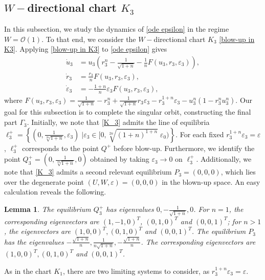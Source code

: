\documentclass[10pt,a4paper]{amsart}
\newtheorem{lem}{Lemma}
\begin{document}
\subsection{$W-$directional chart $K_3$}
In this subsection, we study the dynamics of \eqref{ode epsilon} in the regime $W=\mathcal{O}(1)$. To that end, we consider the $W-$directional chart $K_3$ \eqref{blow-up in K3}.
Applying \eqref{blow-up in K3} to \eqref{ode epsilon} gives 
\begin{equation}
    \begin{aligned}
        \dot{u}_3&=u_3\left(r_3^n-\tfrac{1}{\sqrt{1+n}}-\tfrac{1}{n}F(u_3, r_3, \varepsilon_3)\right),\\
        \dot{r}_3&=\tfrac{r_3}{n} F(u_3, r_3, \varepsilon_3),\\
        \dot{\varepsilon}_3&=-\tfrac{1+n}{n}\varepsilon_3 F(u_3, r_3, \varepsilon_3),
        \label{K_3}
    \end{aligned}
\end{equation}
where $F(u_3, r_3, \varepsilon_3)=\tfrac{1}{\sqrt{1+n}}-r_3^n+\tfrac{1}{\sqrt{1+n}}r_3\varepsilon_3-r_3^{1+n}\varepsilon_3-u_3^n(1-r_3^nu_3^n)$.
Our goal for this subsection is to complete the singular orbit, constructing the final part $\Gamma_3$.
Initially, we note that \eqref{K_3} admits the line of equilibria $\ell_3^+=\left\{\left(0, \tfrac{1}{\sqrt[2n]{1+n}}, \varepsilon_3\right)\;\big|\varepsilon_3\in[0, \sqrt[2n]{(1+n)^{1+n}}\;\varepsilon_0)\right\}$. For each fixed $r_3^{1+n}\varepsilon_3=\varepsilon$, $\ell_3^+$ corresponds to the point $Q^+$ before blow-up. Furthermore, we identify the point $Q_3^+=\left(0, \tfrac{1}{\sqrt[2n]{1+n}}, 0\right)$ obtained by taking $\varepsilon_3\to0$ on $\ell_3^+$. Additionally, we note that \eqref{K_3} admits a second relevant equilibrium $P_3=(0,0,0)$, which lies over the degenerate point $(U,W,\varepsilon)=(0,0,0)$ in the blown-up space. An easy calculation reveals the following.
\begin{lem}
    The equilibrium $Q_3^+$ has eigenvalues $0, -\tfrac{1}{\sqrt{1+n}}, 0$. For $n=1$, the corresponding eigenvectors are $(1, -1, 0)^T$, $(0,1,0)^T$ and $(0,0,1)^T$; for $n>1$, the eigenvectors are $(1,0,0)^T, (0,1,0)^T$ and $(0,0,1)^T$.
    The equilibrium $P_3$ has the eigenvalues $-\tfrac{\sqrt{1+n}}{n},\tfrac{1}{n\sqrt{1+n}},-\tfrac{\sqrt{1+n}}{n}$. The corresponding eigenvectors are $(1,0,0)^T, (0,1,0)^T$ and $(0,0,1)^T$.
    \label{lem: K_3 lin}
\end{lem}
As in the chart $K_1$, there are two limiting systems to consider, as $r_3^{1+n}\varepsilon_3=\varepsilon$.
\end{document}
